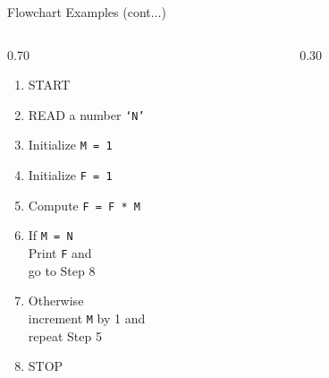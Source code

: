 \documentclass[aspectratio=169]{beamer}
\begin{document}
	\begin{frame}{Flowchart Examples (cont...)}
		\vspace*{-0.4cm}
		\begin{columns}[T,onlytextwidth]
			
			
			\begin{column}{0.70\textwidth}
				
				\begin{enumerate}\small
					\item START
					\item READ a number \texttt{`N'}
					\item Initialize \texttt{M = 1}
					\item Initialize \texttt{F = 1}
					\item Compute \texttt{F = F * M}
					\item If \texttt{M = N}\\ \qquad Print \texttt{F} and \\ \qquad go to Step 8
					\item Otherwise\\ \qquad increment \texttt{M} by 1 and \\ \qquad repeat Step 5
					\item STOP
				\end{enumerate}
				
			\end{column}
			
			
			
			\begin{column}{0.30\textwidth}
				
				\begin{tikzpicture}[remember picture, overlay, scale=0.70,]
					

\end{tikzpicture}
\end{column}
\end{columns}
\end{frame}
\end{document}

